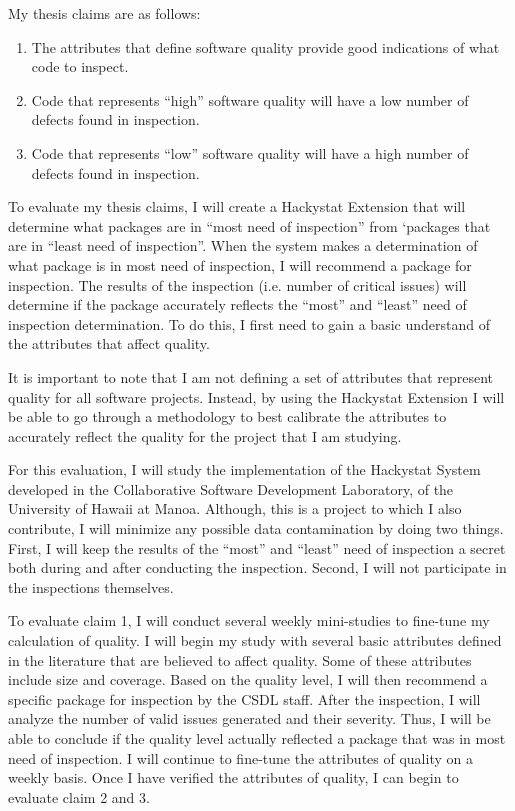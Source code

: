 \documentclass[11pt,twocolumn]{article}
\begin{document}
My thesis claims are as follows: 
\begin{enumerate}
\item The attributes that define software quality provide good indications
  of what code to inspect.
\item Code that represents ``high'' software quality will have a low number
  of defects found in inspection.
\item Code that represents ``low'' software quality will have a high number
  of defects found in inspection.
\end{enumerate}

\label{sec:evaluation}
To evaluate my thesis claims, I will create a Hackystat Extension that will
determine what packages are in ``most need of inspection'' from `packages
that are in ``least need of inspection''. When the system makes a
determination of what package is in most need of inspection, I will
recommend a package for inspection. The results of the inspection (i.e.
number of critical issues) will determine if the package accurately
reflects the ``most'' and ``least'' need of inspection determination.  To
do this, I first need to gain a basic understand of the attributes that
affect quality.

It is important to note that I am not defining a set of attributes that
represent quality for all software projects. Instead, by using the
Hackystat Extension I will be able to go through a methodology to best
calibrate the attributes to accurately reflect the quality for the project
that I am studying.

For this evaluation, I will study the implementation of the Hackystat
System developed in the Collaborative Software Development Laboratory, of
the University of Hawaii at Manoa. Although, this is a project to which I
also contribute, I will minimize any possible data contamination by doing
two things. First, I will keep the results of the ``most'' and ``least''
need of inspection a secret both during and after conducting the
inspection. Second, I will not participate in the inspections themselves.

To evaluate claim 1, I will conduct several weekly mini-studies to
fine-tune my calculation of quality. I will begin my study with several
basic attributes defined in the literature that are believed to affect
quality. Some of these attributes include size and coverage. Based on the
quality level, I will then recommend a specific package for inspection by
the CSDL staff. After the inspection, I will analyze the number of valid issues
generated and their severity. Thus, I will be able to conclude if the
quality level actually reflected a package that was in most need of inspection.
I will continue to fine-tune the attributes of quality on a weekly basis.
Once I have verified the attributes of quality, I can begin to evaluate
claim 2 and 3.
\end{document}
